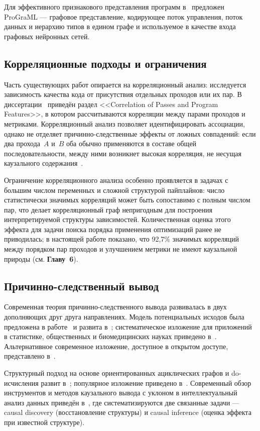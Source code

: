 Для эффективного признакового представления программ в~\cite{cummins2021programl} предложен ProGraML --- графовое представление, кодирующее поток управления, поток данных и иерархию типов в едином графе и используемое в качестве входа графовых нейронных сетей.

\subsection{Корреляционные подходы и ограничения}

Часть существующих работ опирается на корреляционный анализ: исследуется зависимость качества кода от присутствия отдельных проходов или их пар. В диссертации~\cite{hajali2020phd} приведён раздел <<Correlation of Passes and Program Features>>, в котором рассчитываются корреляции между парами проходов и метриками. Корреляционный анализ позволяет идентифицировать ассоциации, однако не отделяет причинно-следственные эффекты от ложных совпадений: если два прохода~$A$ и~$B$ оба обычно применяются в составе общей последовательности, между ними возникнет высокая корреляция, не несущая каузального содержания~\cite{pearl2018book}.

Ограничение корреляционного анализа особенно проявляется в задачах с большим числом переменных и сложной структурой пайплайнов: число статистически значимых корреляций может быть сопоставимо с полным числом пар, что делает корреляционный граф непригодным для построения интерпретируемой структуры зависимостей. Количественная оценка этого эффекта для задачи поиска порядка применения оптимизаций ранее не приводилась; в настоящей работе показано, что 92{,}7\% значимых корреляций между порядком пар проходов и улучшением метрики не имеют каузальной природы (см. \textbf{Главу~6}).

\subsection{Причинно-следственный вывод}

Современная теория причинно-следственного вывода развивалась в двух дополняющих друг друга направлениях. Модель потенциальных исходов была предложена в работе~\cite{splawa1923} и развита в~\cite{rubin1974}; систематическое изложение для приложений в статистике, общественных и биомедицинских науках приведено в~\cite{imbens2015causal}. Альтернативное современное изложение, доступное в открытом доступе, представлено в~\cite{hernan2020}.

Структурный подход на основе ориентированных ациклических графов и do-исчисления развит в~\cite{pearl2009causality, pearl2009overview, pearl2010introduction}; популярное изложение приведено в~\cite{pearl2018book}. Современный обзор инструментов и методов каузального вывода с уклоном в интеллектуальный анализ данных приведён в~\cite{nogueira2022methods}, где систематизируются две связанные задачи --- causal discovery (восстановление структуры) и causal inference (оценка эффекта при известной структуре).

